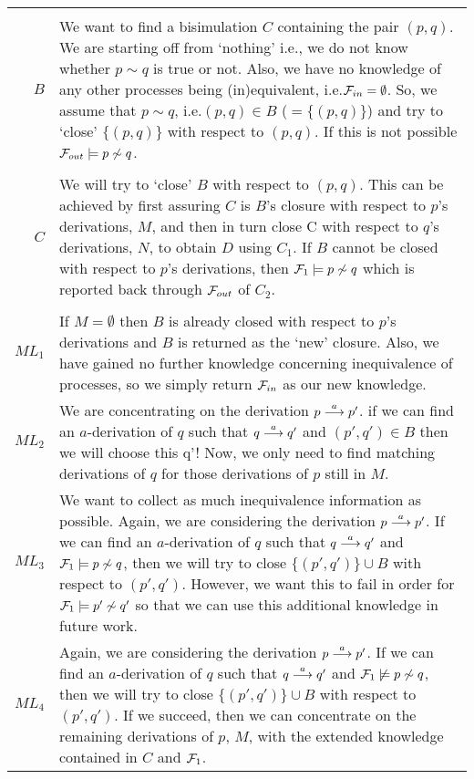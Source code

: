 \begin{minipage}{\linewidth}\label{figNewSysInfInformal}
\begingroup\scriptsize%
\begin{tabular}{r@{$\;$:$\;\;$}p{.7\linewidth}}
\multicolumn{2}{l}{}\\
$B$ &
We want to find a bisimulation $C$ containing the pair $(p,q)$. We are starting off from `nothing' i.e.\@, we do not know whether $p\sim q$ is true or not. Also, we have no knowledge of any other processes being (in)equivalent, i.e.\@ ${\cal F}_{in}=\emptyset$. So, we assume that $p\sim q$, i.e.\@ $(p,q)\in B$ ($= \{(p,q)\}$) and try to `close' $\{(p,q)\}$ with respect to $(p,q)$. If this is not possible ${\cal F}_{out}\models p\not\sim q$.\\
\multicolumn{2}{l}{}\\
$C$ &
We will try to `close' $B$ with respect to $(p,q)$. This can be achieved by first assuring $C$ is $B$'s closure with respect to $p$'s derivations, $M$, and then in turn close C with respect to $q$'s derivations, $N$, to obtain $D$ using $C_1$. If $B$ cannot be closed with respect to $p$'s derivations, then ${\cal F}_1\models p\not\sim q$ which is reported back through ${\cal F}_{out}$ of $C_2$.\\
\multicolumn{2}{l}{}\\
$ML_1$ &
If $M=\emptyset$ then $B$ is already closed with respect to $p$'s derivations and $B$ is returned as the `new' closure. Also, we have gained no further knowledge concerning inequivalence of processes, so we simply return ${\cal F}_{in}$ as our new knowledge.\\

$ML_2$ &
We are concentrating on the derivation $p\stackrel{a}{\longrightarrow} p'$. if we can find an $a$-derivation of $q$ such that $q\stackrel{a}{\longrightarrow}q'$ and $(p',q')\in B$ then we will choose this q'! Now, we only need to find matching derivations of $q$ for those derivations of $p$ still in $M$.\\

$ML_3$ &
We want to collect as much inequivalence information as possible. Again, we are considering the derivation $p\stackrel{a}{\longrightarrow}p'$. If we can find an $a$-derivation of $q$ such that $q\stackrel{a}{\longrightarrow}q'$ and ${\cal F}_1\models p\not\sim q$, then we will try to close $\{(p',q')\}\cup B$ with respect to $(p',q')$. However, we want this to fail in order for ${\cal F}_1\models p'\not\sim q'$ so that we can use this additional knowledge in future work.\\

$ML_4$ &
Again, we are considering the derivation $p\stackrel{a}{\longrightarrow}p'$. If we can find an $a$-derivation of $q$ such that $q\stackrel{a}{\longrightarrow}q'$ and ${\cal F}_1\not\models p\not\sim q$, then we will try to close $\{(p',q')\}\cup B$ with respect to $(p',q')$. If we succeed, then we can concentrate on the remaining derivations of $p$, $M$, with the extended knowledge contained in $C$ and ${\cal F}_1$.\\


\end{tabular}
\end{minipage}
